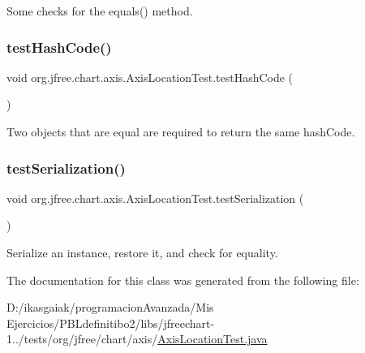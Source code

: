 Some checks for the equals() method. \mbox{\label{classorg_1_1jfree_1_1chart_1_1axis_1_1_axis_location_test_ad7994555f702234da932f867aeac32d3}} 
\subsubsection{\texorpdfstring{test\+Hash\+Code()}{testHashCode()}}
{\footnotesize\ttfamily void org.\+jfree.\+chart.\+axis.\+Axis\+Location\+Test.\+test\+Hash\+Code (\begin{DoxyParamCaption}{ }\end{DoxyParamCaption})}

Two objects that are equal are required to return the same hash\+Code. \mbox{\label{classorg_1_1jfree_1_1chart_1_1axis_1_1_axis_location_test_a1398815172f9ed04f967a2789d63f84b}} 
\subsubsection{\texorpdfstring{test\+Serialization()}{testSerialization()}}
{\footnotesize\ttfamily void org.\+jfree.\+chart.\+axis.\+Axis\+Location\+Test.\+test\+Serialization (\begin{DoxyParamCaption}{ }\end{DoxyParamCaption})}

Serialize an instance, restore it, and check for equality. 

The documentation for this class was generated from the following file\+:\begin{DoxyCompactItemize}
\item 
D\+:/ikasgaiak/programacion\+Avanzada/\+Mis Ejercicios/\+P\+B\+Ldefinitibo2/libs/jfreechart-\/1../tests/org/jfree/chart/axis/\mbox{\hyperlink{_axis_location_test_8java}{Axis\+Location\+Test.\+java}}\end{DoxyCompactItemize}
